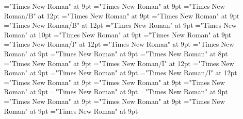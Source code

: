 \documentclass[gps1,twoside]{article}
\begin{document}
\font\nontrivialentryrootscomplexformsnotsubentrycomplexformsnotsubentriessensesensesentrybefore="Times New Roman" at 9pt
\font\nontrivialentryrootscomplexformsnotsubentrycomplexformsnotsubentriessensesensesentryafter="Times New Roman" at 9pt
\font\nontrivialentryrootnontrivialentryrootscomplexformsnotsubentrycomplexformsnotsubentriessensesensesentry="Times New Roman/B" at 12pt
\font\spanspansensecontentspansensessensesensesentrybefore="Times New Roman" at 9pt
\font\sensessensesensesentryafter="Times New Roman" at 9pt
\font\sensenumbersensecontentsensessensesensesentry="Times New Roman/B" at 12pt
\font\sensenumbersensecontentsensessensesensesentryafter="Times New Roman" at 9pt
\font\sensesensessensesensesentry="Times New Roman" at 10pt
\font\sensetypesensesensessensesensesentrybefore="Times New Roman" at 9pt
\font\sensetypesensesensessensesensesentryafter="Times New Roman" at 9pt
\font\sensetypesensesensessensesensesentry="Times New Roman/I" at 12pt
\font\spanspanabbreviationsensetypesensesensessensesensesentrybefore="Times New Roman" at 9pt
\font\spanspandefinitionorglosssensesensessensesensesentrybefore="Times New Roman" at 9pt
\font\spandefinitionorglosssensesensessensesensesentrylastchildafter="Times New Roman" at 9pt
\font\exampleexampleexamplessensesensessensesensesentrybefore="Times New Roman" at 8pt
\font\examplessensesensessensesensesentryafter="Times New Roman" at 9pt
\font\spanbzhexampleexampleexamplessensesensessensesensesentry="Times New Roman/I" at 12pt
\font\spanspanexampleexampleexamplessensesensessensesensesentrybefore="Times New Roman" at 9pt
\font\spanexampleexampleexamplessensesensessensesensesentrylastchildafter="Times New Roman" at 9pt
\font\spanexampleexampleexamplessensesensessensesensesentry="Times New Roman/I" at 12pt
\font\spanspantranslationtranslationtranslationsexampleexamplessensesensessensesensesentrybefore="Times New Roman" at 9pt
\font\spantranslationtranslationtranslationsexampleexamplessensesensessensesensesentrylastchildafter="Times New Roman" at 9pt
\font\spanspanencyclopedicinfosensesensessensesensesentrybefore="Times New Roman" at 9pt
\font\spanencyclopedicinfosensesensessensesensesentryfirstchildbefore="Times New Roman" at 9pt
\font\spanencyclopedicinfosensesensessensesensesentrylastchildafter="Times New Roman" at 9pt
\font\spanspanrestrictionssensesensessensesensesentrybefore="Times New Roman" at 9pt
\font\spanrestrictionssensesensessensesensesentryfirstchildbefore="Times New Roman" at 9pt
\font\spanrestrictionssensesensessensesensesentrylastchildafter="Times New Roman" at 9pt
\font\spanspanlexsensereferencessensesensessensesensesentrybefore="Times New Roman" at 9pt
\end{document}

